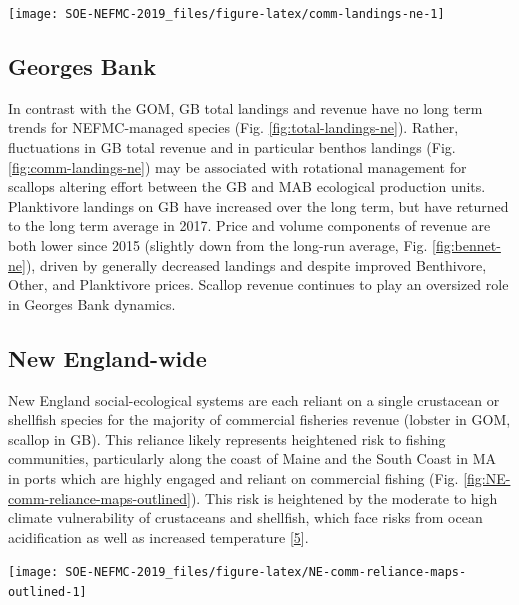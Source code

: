 \documentclass[10pt,]{article}
\let\origfigure\figure
\let\endorigfigure\endfigure
\renewenvironment{figure}[1][2] {
    \expandafter\origfigure\expandafter[H]
} {
    \endorigfigure
}
\begin{document}
\begin{figure}

{\centering \texttt{[image: SOE-NEFMC-2019\_files/figure-latex/comm-landings-ne-1]} 

}

\caption{NEFMC managed species landings (red) and total commercial landings (black) by feeding guild in Gulf of Maine (left) and Georges Bank (right).}\label{fig:comm-landings-ne}
\end{figure}

\subsection{Georges Bank}\label{georges-bank}

In contrast with the GOM, GB total landings and revenue have no long
term trends for NEFMC-managed species (Fig.
\ref{fig:total-landings-ne}). Rather, fluctuations in GB total revenue
and in particular benthos landings (Fig. \ref{fig:comm-landings-ne}) may
be associated with rotational management for scallops altering effort
between the GB and MAB ecological production units. Planktivore landings
on GB have increased over the long term, but have returned to the long
term average in 2017. Price and volume components of revenue are both
lower since 2015 (slightly down from the long-run average, Fig.
\ref{fig:bennet-ne}), driven by generally decreased landings and despite
improved Benthivore, Other, and Planktivore prices. Scallop revenue
continues to play an oversized role in Georges Bank dynamics.

\subsection{New England-wide}\label{new-england-wide}

New England social-ecological systems are each reliant on a single
crustacean or shellfish species for the majority of commercial fisheries
revenue (lobster in GOM, scallop in GB). This reliance likely represents
heightened risk to fishing communities, particularly along the coast of
Maine and the South Coast in MA in ports which are highly engaged and
reliant on commercial fishing (Fig.
\ref{fig:NE-comm-reliance-maps-outlined}). This risk is heightened by
the moderate to high climate vulnerability of crustaceans and shellfish,
which face risks from ocean acidification as well as increased
temperature {[}\protect\hyperlink{ref-hare_vulnerability_2016}{5}{]}.

\begin{figure}

{\centering \texttt{[image: SOE-NEFMC-2019\_files/figure-latex/NE-comm-reliance-maps-outlined-1]} 

}

\caption{Commercial engagement (total pounds landed, value landed, commercial permits and commercial dealers in a community) and reliance (per capita engagement) based on 2016 landings and the ACS running average of 2012-2016 census data.}\label{fig:NE-comm-reliance-maps-outlined}
\end{figure}
\end{document}

